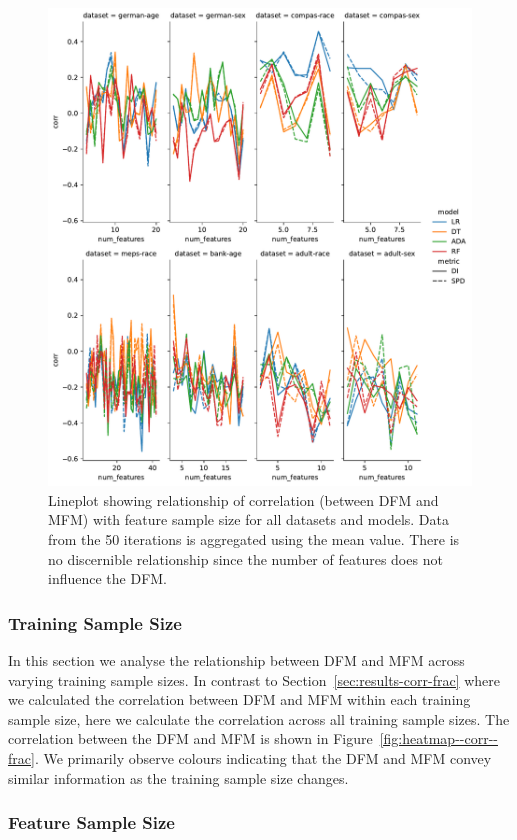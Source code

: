 \documentclass[sigconf,review]{acmart}
\begin{document}
\begin{figure}
  \centering
  \includegraphics[width=0.8\linewidth]{lineplot--num-features--corr.pdf}
  \caption{Lineplot showing relationship of correlation (between DFM
    and MFM) with feature sample size for all datasets and models.
    Data from the 50 iterations is aggregated using the mean value.
    There is no discernible relationship since the number of features
    does not influence the DFM.}
  \label{fig:lineplot--num-features--corr}
\end{figure}

\subsubsection{Training Sample Size}

In this section we analyse the relationship between DFM and MFM across
varying training sample sizes. In contrast to
Section \ref{sec:results-corr-frac} where we calculated the
correlation between DFM and MFM within each training sample size, here
we calculate the correlation across all training sample sizes. The
correlation between the DFM and MFM is shown in
Figure \ref{fig:heatmap--corr--frac}. We primarily observe colours
indicating that the DFM and MFM convey similar information as the
training sample size changes.

\subsubsection{Feature Sample Size}
\end{document}
